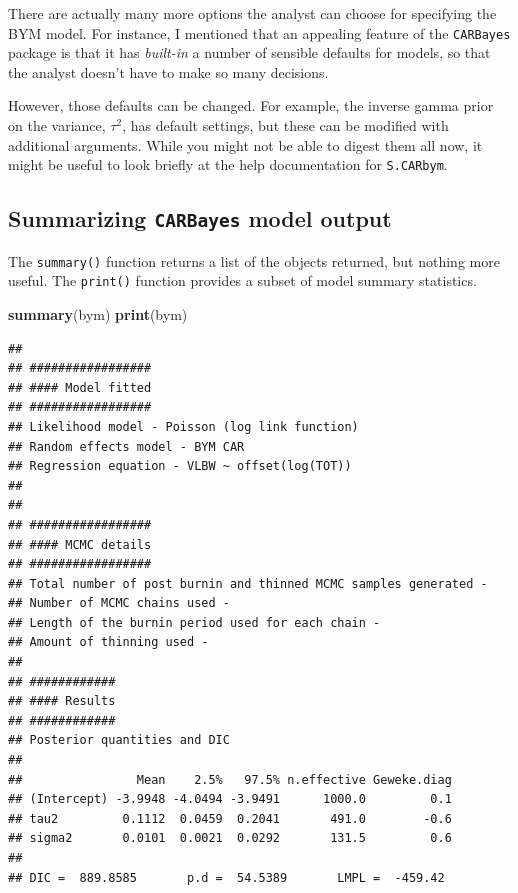 \documentclass[
]{book}
\newenvironment{Shaded}{\begin{snugshade}}{\end{snugshade}}
\newcommand{\FunctionTok}[1]{\textcolor[rgb]{0.13,0.29,0.53}{\textbf{#1}}}
\newcommand{\NormalTok}[1]{#1}
\begin{document}
There are actually many more options the analyst can choose for specifying the BYM model. For instance, I mentioned that an appealing feature of the \texttt{CARBayes} package is that it has \emph{built-in} a number of sensible defaults for models, so that the analyst doesn't have to make so many decisions.

However, those defaults can be changed. For example, the inverse gamma prior on the variance, \(\tau^2\), has default settings, but these can be modified with additional arguments. While you might not be able to digest them all now, it might be useful to look briefly at the help documentation for \texttt{S.CARbym}.

\hypertarget{summarizing-carbayes-model-output}{%
\subsection{\texorpdfstring{Summarizing \texttt{CARBayes} model output}{Summarizing CARBayes model output}}\label{summarizing-carbayes-model-output}}

The \texttt{summary()} function returns a list of the objects returned, but nothing more useful. The \texttt{print()} function provides a subset of model summary statistics.

\begin{Shaded}
\begin{Highlighting}[]
\FunctionTok{summary}\NormalTok{(bym)}
\FunctionTok{print}\NormalTok{(bym)}
\end{Highlighting}
\end{Shaded}

\begin{verbatim}
## 
## #################
## #### Model fitted
## #################
## Likelihood model - Poisson (log link function) 
## Random effects model - BYM CAR
## Regression equation - VLBW ~ offset(log(TOT))
## 
## 
## #################
## #### MCMC details
## #################
## Total number of post burnin and thinned MCMC samples generated - 
## Number of MCMC chains used - 
## Length of the burnin period used for each chain - 
## Amount of thinning used - 
## 
## ############
## #### Results
## ############
## Posterior quantities and DIC
## 
##                Mean    2.5%   97.5% n.effective Geweke.diag
## (Intercept) -3.9948 -4.0494 -3.9491      1000.0         0.1
## tau2         0.1112  0.0459  0.2041       491.0        -0.6
## sigma2       0.0101  0.0021  0.0292       131.5         0.6
## 
## DIC =  889.8585       p.d =  54.5389       LMPL =  -459.42
\end{verbatim}
\end{document}
